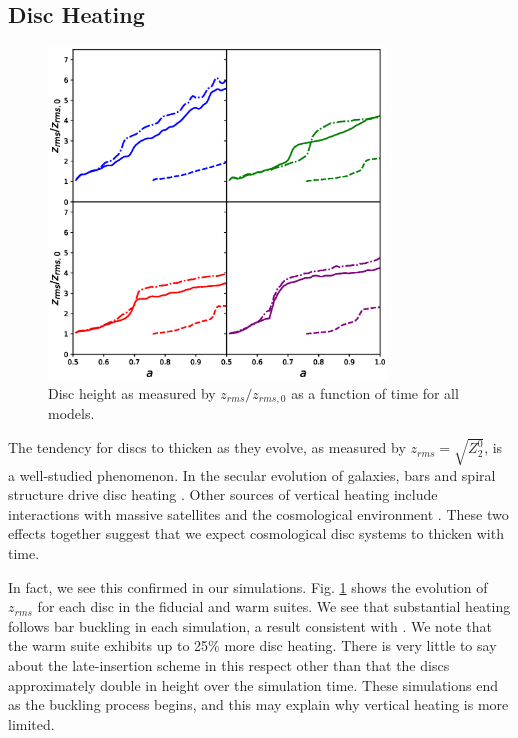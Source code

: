 \subsection{Disc Heating}
\begin{figure}
	\centering
	\includegraphics[width=0.8\textwidth]{../figures/z_rms_all_models_four_panel.eps}
	\caption{Disc height as measured by $z_{rms}/z_{rms,0}$ as a function of time for all models.} \label{fig:z_rms}
\end{figure}


The tendency for discs to thicken as they evolve, as measured by $z_{rms} = \sqrt{Z_2^0}$, is a well-studied phenomenon. In the secular evolution of galaxies, bars and spiral structure drive disc heating \citep{mcmillan_dehnen_2007,Sellwood2013}. Other sources of vertical heating include interactions with massive satellites and the cosmological environment \citep[for example]{lacey_ostriker_1985, toth_ostriker_1992, sellwood_1998, bauer2018b}. These two effects together suggest that we expect cosmological disc systems to thicken with time.

In fact, we see this confirmed in our simulations.  Fig. \ref{fig:z_rms} shows the evolution of $z_{rms}$ for each disc in the fiducial and warm suites. We see that substantial heating follows bar buckling in each simulation, a result consistent with \citet{ys_2015,bauer2018b}. We note that the warm suite exhibits up to 25\% more disc heating.  There is very little to say about the late-insertion scheme in this respect other than that the discs approximately double in height over the simulation time. These simulations end as the buckling process begins, and this may explain why vertical heating is more limited.\\

